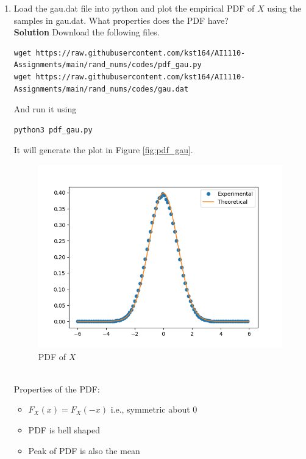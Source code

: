 \documentclass[journal, 12pt, twocolumn]{IEEEtran}
\begin{document}
\begin{enumerate}[label=\arabic{section}.\arabic*]
    \item
        Load the gau.dat file into python and plot the empirical PDF of $X$ using the samples in gau.dat.
        What properties does the PDF have?
        \\
        \textbf{Solution} Download the following files.
        \begin{lstlisting}
wget https://raw.githubusercontent.com/kst164/AI1110-Assignments/main/rand_nums/codes/pdf_gau.py
wget https://raw.githubusercontent.com/kst164/AI1110-Assignments/main/rand_nums/codes/gau.dat
        \end{lstlisting}
        And run it using
        \begin{lstlisting}
python3 pdf_gau.py
        \end{lstlisting}
        It will generate the plot in Figure \eqref{fig:pdf_gau}.
        \begin{figure}[!ht]
            \includegraphics[width=\columnwidth]{figs/pdf_gau.png}
            \caption{PDF of $X$}
            \label{fig:pdf_gau}
        \end{figure}
        \\
        Properties of the PDF:
        \begin{itemize}
            \item $F_X(x) = F_X(-x)$ i.e., symmetric about 0
            \item PDF is bell shaped
            \item Peak of PDF is also the mean
        \end{itemize}


\end{enumerate}
\end{document}
